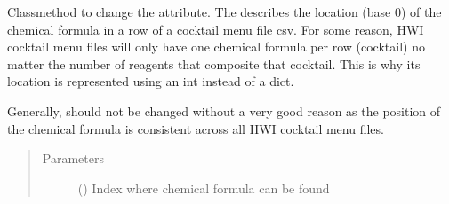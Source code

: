 \documentclass[letterpaper,10pt,english]{sphinxmanual}
\begin{document}
\begin{fulllineitems}
\begin{fulllineitems}
\begin{quote}
\begin{description}
\end{description}\end{quote}

\end{fulllineitems}


\begin{fulllineitems}
\label{\detokenize{polo.utils:polo.utils.io_utils.CocktailMenuReader.set_formula_pos}}
Classmethod to change the {\hyperref[\detokenize{polo.utils:polo.utils.io_utils.CocktailMenuReader.formula_pos}]{}}
attribute. The {\hyperref[\detokenize{polo.utils:polo.utils.io_utils.CocktailMenuReader.formula_pos}]{}}
describes the location (base 0) of the chemical formula in a row of
a cocktail menu file csv. For some reason, HWI cocktail menu files
will only have one chemical formula per row (cocktail) no matter
the number of reagents that composite that cocktail. This is why
its location is represented using an int instead of a dict.

Generally, {\hyperref[\detokenize{polo.utils:polo.utils.io_utils.CocktailMenuReader.formula_pos}]{}}
should not be changed without a very good
reason as the position of the chemical formula is consistent across
all HWI cocktail menu files.
\begin{quote}\begin{description}
\item[{Parameters}] \leavevmode
{} () \textendash{} Index where chemical formula can be found

\end{description}\end{quote}

\end{fulllineitems}


\end{fulllineitems}

\end{document}
